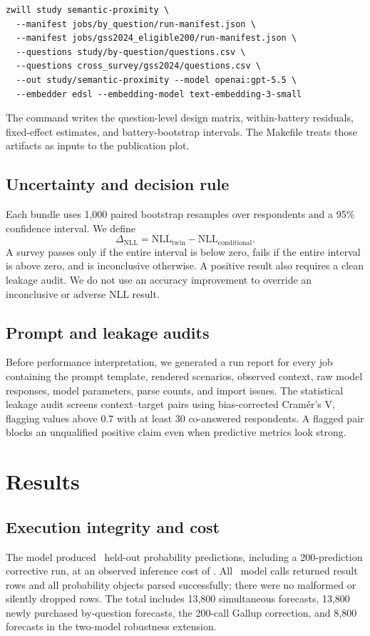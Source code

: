 \documentclass[11pt]{article}
\begin{document}
\begin{lstlisting}[style=shell]
zwill study semantic-proximity \
  --manifest jobs/by_question/run-manifest.json \
  --manifest jobs/gss2024_eligible200/run-manifest.json \
  --questions study/by-question/questions.csv \
  --questions cross_survey/gss2024/questions.csv \
  --out study/semantic-proximity --model openai:gpt-5.5 \
  --embedder edsl --embedding-model text-embedding-3-small
\end{lstlisting}
The command writes the question-level design matrix, within-battery residuals,
fixed-effect estimates, and battery-bootstrap intervals. The Makefile treats
those artifacts as inputs to the publication plot.

\subsection{Uncertainty and decision rule}
Each bundle uses 1,000 paired bootstrap resamples over respondents and a 95\%
confidence interval. We define
\[
 \Delta_{\mathrm{NLL}} =
 \mathrm{NLL}_{\mathrm{twin}}-\mathrm{NLL}_{\mathrm{conditional}}.
\]
A survey passes only if the entire interval is below zero, fails if the entire
interval is above zero, and is inconclusive otherwise. A positive result also
requires a clean leakage audit. We do not use an accuracy improvement to
override an inconclusive or adverse NLL result.

\subsection{Prompt and leakage audits}
Before performance interpretation, we generated a run report for every job
containing the prompt template, rendered scenarios, observed context, raw model
responses, model parameters, parse counts, and import issues. The statistical
leakage audit screens context--target pairs using bias-corrected Cramér's V,
flagging values above 0.7 with at least 30 co-answered respondents. A flagged
pair blocks an unqualified positive claim even when predictive metrics look
strong.

\section{Results}
\subsection{Execution integrity and cost}
The model produced \TotalPredictions\ held-out probability predictions,
including a 200-prediction corrective run, at an observed inference cost of
\TotalCost. All \TotalPredictions\ model calls returned result rows and all probability
objects parsed successfully; there were no malformed or silently dropped rows.
The total includes 13,800 simultaneous forecasts, 13,800 newly purchased
by-question forecasts, the 200-call Gallup correction, and 8,800 forecasts in
the two-model robustness extension.
\end{document}
